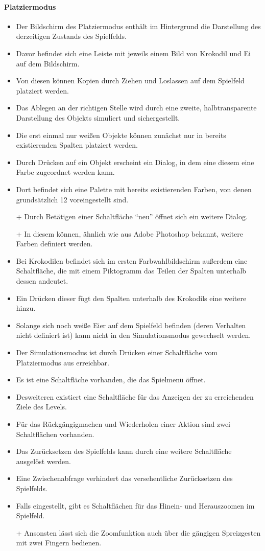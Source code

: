 \paragraph{Platziermodus}\mbox{}\newline
\begin{itemize}
\item Der Bildschirm des Platziermodus enthält im Hintergrund die Darstellung
des derzeitigen Zustands des Spielfelds.
\item Davor befindet sich eine Leiste mit jeweils einem Bild von Krokodil und Ei auf dem Bildschirm.
\item Von diesen können Kopien durch Ziehen und Loslassen auf dem Spielfeld platziert werden. 
\item Das Ablegen an der richtigen Stelle wird durch eine zweite, 
halbtransparente Darstellung des Objekts simuliert und sichergestellt. 
\item Die erst einmal nur weißen Objekte können zunächst nur in bereits 
existierenden Spalten platziert werden.
\item  Durch Drücken auf ein Objekt erscheint 
ein Dialog, in dem eine diesem eine Farbe zugeordnet werden kann.
\item Dort befindet sich eine Palette mit bereits existierenden Farben, von denen 
grundsätzlich 12 voreingestellt sind.
\item[+] Durch Betätigen einer Schaltfläche ``neu'' öffnet sich ein weitere Dialog.
\item[+] In diesem können, ähnlich wie aus Adobe Photoshop bekannt, weitere Farben definiert werden.
\item Bei Krokodilen befindet sich im ersten Farbwahlbildschirm außerdem eine Schaltfläche, die mit einem
Piktogramm das Teilen der Spalten unterhalb dessen andeutet.
\item  Ein Drücken dieser fügt den Spalten unterhalb des Krokodils eine weitere hinzu.
\item Solange sich noch weiße Eier auf dem Spielfeld befinden (deren Verhalten
nicht definiert ist) kann nicht in den Simulationsmodus gewechselt werden.
\item Der Simulationsmodus ist durch Drücken einer Schaltfläche vom Platziermodus
aus erreichbar.
\item Es ist eine Schaltfläche vorhanden, die das Spielmenü öffnet.
\item Desweiteren existiert eine Schaltfläche für das Anzeigen der zu erreichenden Ziele des Levels.
\item Für das Rückgängigmachen und Wiederholen einer Aktion sind zwei Schaltflächen vorhanden.
\item Das Zurücksetzen des Spielfelds kann durch eine weitere Schaltfläche ausgelöst werden.
\item Eine Zwischenabfrage verhindert das versehentliche Zurücksetzen des Spielfelds.
\item Falls eingestellt, gibt es Schaltflächen für das Hinein- und Herauszoomen im Spielfeld.
\item[+] Ansonsten lässt sich die Zoomfunktion auch über die gängigen Spreizgesten mit zwei Fingern bedienen.
\end{itemize}

